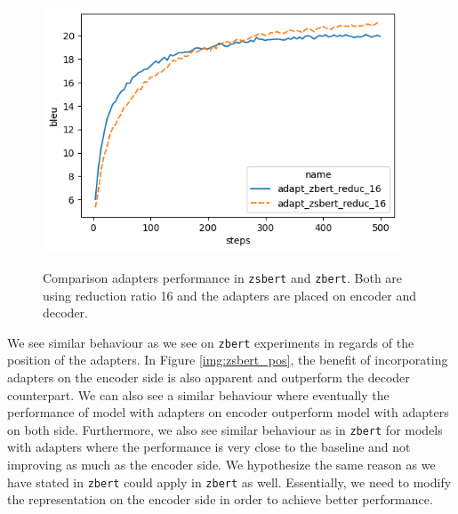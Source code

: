\begin{figure}[h]
    {\includegraphics[width=0.95\textwidth]{img/zbert_vs_zsbert.png}}
    \centering
    \caption{Comparison adapters performance in \texttt{zsbert} and \texttt{zbert}. Both are using reduction ratio 16 and the adapters are placed on encoder and decoder.}
    \label{img:zbert_vs_zsbert}
\end{figure}

We see similar behaviour as we see on \texttt{zbert} experiments in regards of the position of the adapters. In Figure \ref{img:zsbert_pos}, the benefit of incorporating adapters on the encoder side is also apparent and outperform the decoder counterpart. We can also see a similar behaviour where eventually the performance of model with adapters on encoder outperform model with adapters on both side. Furthermore, we also see similar behaviour as in \texttt{zbert} for models with adapters where the performance is very close to the baseline and not improving as much as the encoder side. We hypothesize the same reason as we have stated in \texttt{zbert} could apply in \texttt{zbert} as well. Essentially, we need to modify the representation on the encoder side in order to achieve better performance.
